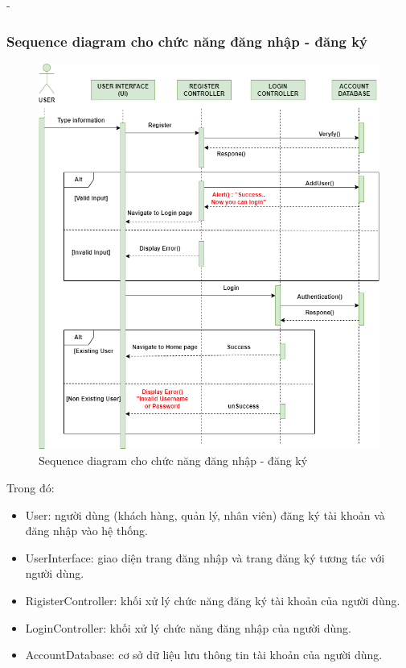 \begin {list} {-}{}
\subsubsection{Sequence diagram cho chức năng đăng nhập - đăng ký}
\begin{figure}[H]
    \centering
    \includegraphics[scale=0.6]{images/hieu/chap-3/login-signup-sequence-diagram.png}
    \caption{Sequence diagram cho chức năng đăng nhập - đăng ký}
\end{figure}
Trong đó:
\begin{itemize}
    \item User: người dùng (khách hàng, quản lý, nhân viên) đăng ký tài khoản và đăng nhập vào hệ thống.
    \item UserInterface: giao diện trang đăng nhập và trang đăng ký tương tác với người dùng.
    \item RigisterController: khối xử lý chức năng đăng ký tài khoản của người dùng.
    \item LoginController: khối xử lý chức năng đăng nhập của người dùng.
    \item AccountDatabase: cơ sở dữ liệu lưu thông tin tài khoản của người dùng.
\end{itemize}
\newpage

\end{list}
